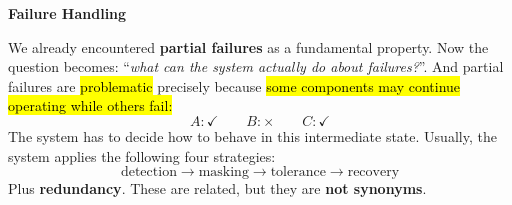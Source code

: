 \newpage

\begin{flushleft}
    \textcolor{Red2}{ \textbf{Failure Handling}}
\end{flushleft}
We already encountered \textbf{partial failures} as a fundamental property. Now the question becomes: ``\emph{what can the system actually do about failures?}''. And partial failures are \hl{problematic} precisely because \hl{some components may continue operating while others fail:}
\begin{equation*}
    A:\checkmark
    \qquad
    B:\times
    \qquad
    C:\checkmark
\end{equation*}
The system has to decide how to behave in this intermediate state. Usually, the system applies the following four strategies:
\begin{equation*}
    \text{detection}
    \rightarrow
    \text{masking}
    \rightarrow
    \text{tolerance}
    \rightarrow
    \text{recovery}
\end{equation*}
Plus \textbf{redundancy}. These are related, but they are \textbf{not synonyms}.
